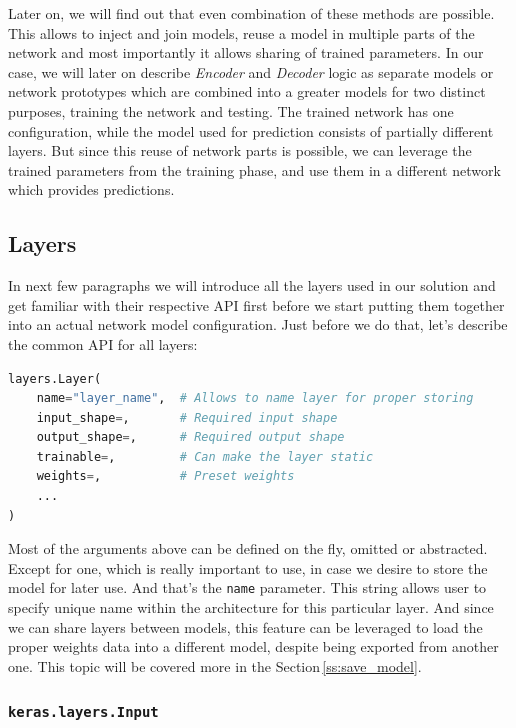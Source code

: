 Later on, we will find out that even combination of these methods are possible. This allows to inject and join models, reuse a model in multiple parts of the network and most importantly it allows sharing of trained parameters. In our case, we will later on describe \textit{Encoder} and \textit{Decoder} logic as separate models or network prototypes which are combined into a greater models for two distinct purposes, training the network and testing. The trained network has one configuration, while the model used for prediction consists of partially different layers. But since this reuse of network parts is possible, we can leverage the trained parameters from the training phase, and use them in a different network which provides predictions.

\subsection{Layers}

In next few paragraphs we will introduce all the layers used in our solution and get familiar with their respective API first before we start putting them together into an actual network model configuration. Just before we do that, let's describe the common API for all layers:

\begin{lstlisting}[language=Python, caption=Common layer API]
layers.Layer(
    name="layer_name",  # Allows to name layer for proper storing
    input_shape=,       # Required input shape
    output_shape=,      # Required output shape
    trainable=,         # Can make the layer static
    weights=,           # Preset weights
    ...
)
\end{lstlisting}

Most of the arguments above can be defined on the fly, omitted or abstracted. Except for one, which is really important to use, in case we desire to store the model for later use. And that's the \texttt{name} parameter. This string allows user to specify unique name within the architecture for this particular layer. And since we can share layers between models, this feature can be leveraged to load the proper weights data into a different model, despite being exported from another one. This topic will be covered more in the Section\,\ref{ss:save_model}.

\subsubsection{\texttt{keras.layers.Input}}

